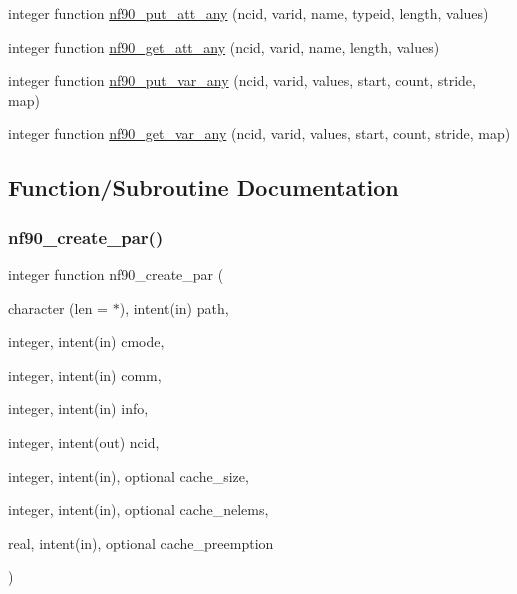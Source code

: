 \begin{DoxyCompactItemize}
\item 
integer function \hyperlink{netcdf4__func_8f90_aaac10ca101f16e1075daa5d58915d40d}{nf90\+\_\+put\+\_\+att\+\_\+any} (ncid, varid, name, typeid, length, values)
\item 
integer function \hyperlink{netcdf4__func_8f90_ae8288b57cec7fb2533224afc4ba0f890}{nf90\+\_\+get\+\_\+att\+\_\+any} (ncid, varid, name, length, values)
\item 
integer function \hyperlink{netcdf4__func_8f90_ac5893a145b81bbd8920c99a7193c8af8}{nf90\+\_\+put\+\_\+var\+\_\+any} (ncid, varid, values, start, count, stride, map)
\item 
integer function \hyperlink{netcdf4__func_8f90_af167ecc2a0d49c398f8f4a8c0a49d70c}{nf90\+\_\+get\+\_\+var\+\_\+any} (ncid, varid, values, start, count, stride, map)
\end{DoxyCompactItemize}


\subsection{Function/\+Subroutine Documentation}
\mbox{\label{netcdf4__func_8f90_ac93652f3ab69d6782ceee82f91633329}} 
\subsubsection{\texorpdfstring{nf90\+\_\+create\+\_\+par()}{nf90\_create\_par()}}
{\footnotesize\ttfamily integer function nf90\+\_\+create\+\_\+par (\begin{DoxyParamCaption}\item[{character (len = $\ast$), intent(in)}]{path,  }\item[{integer, intent(in)}]{cmode,  }\item[{integer, intent(in)}]{comm,  }\item[{integer, intent(in)}]{info,  }\item[{integer, intent(out)}]{ncid,  }\item[{integer, intent(in), optional}]{cache\+\_\+size,  }\item[{integer, intent(in), optional}]{cache\+\_\+nelems,  }\item[{real, intent(in), optional}]{cache\+\_\+preemption }\end{DoxyParamCaption})}



